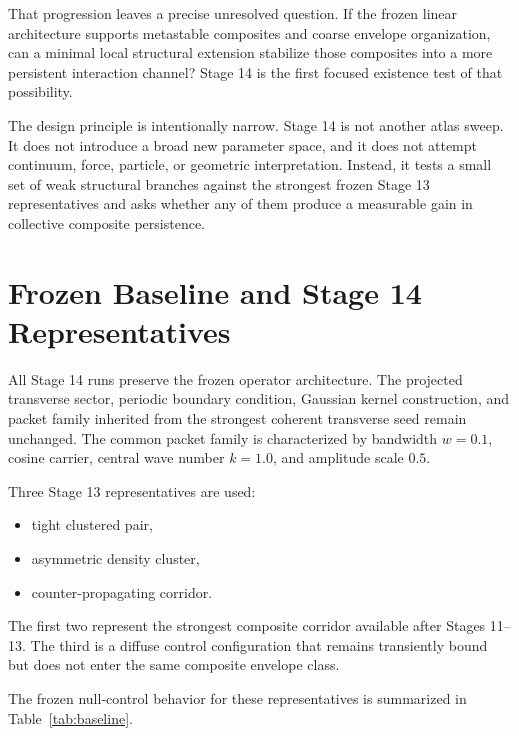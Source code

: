 \documentclass[11pt]{article}
\begin{document}
That progression leaves a precise unresolved question. If the frozen linear architecture supports metastable composites and coarse envelope organization, can a minimal local structural extension stabilize those composites into a more persistent interaction channel? Stage 14 is the first focused existence test of that possibility.

The design principle is intentionally narrow. Stage 14 is not another atlas sweep. It does not introduce a broad new parameter space, and it does not attempt continuum, force, particle, or geometric interpretation. Instead, it tests a small set of weak structural branches against the strongest frozen Stage 13 representatives and asks whether any of them produce a measurable gain in collective composite persistence.

\section{Frozen Baseline and Stage 14 Representatives}

All Stage 14 runs preserve the frozen operator architecture. The projected transverse sector, periodic boundary condition, Gaussian kernel construction, and packet family inherited from the strongest coherent transverse seed remain unchanged. The common packet family is characterized by bandwidth $w=0.1$, cosine carrier, central wave number $k=1.0$, and amplitude scale $0.5$.

Three Stage 13 representatives are used:
\begin{itemize}
\item tight clustered pair,
\item asymmetric density cluster,
\item counter-propagating corridor.
\end{itemize}

The first two represent the strongest composite corridor available after Stages 11--13. The third is a diffuse control configuration that remains transiently bound but does not enter the same composite envelope class.

The frozen null-control behavior for these representatives is summarized in Table~\ref{tab:baseline}.
\end{document}
